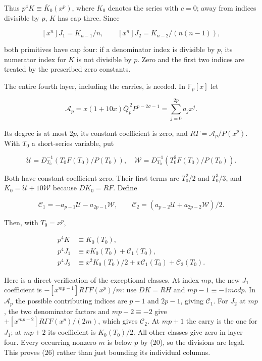\documentclass[11pt,a4paper]{article}
\begin{document}
Thus \(p^{4}K≡\overline{K}_{0}(x^p)\), where \(K_{0}\) denotes the series with \(c=0\); away from indices divisible by \(p\), \(K\) has cap three. Since

\[
[x^n]J_1=K_{n-1}/n,\qquad
[x^n]J_2=K_{n-2}/(n(n-1)),
\]

both primitives have cap four: if a denominator index is divisible by \(p\), its numerator index for \(K\) is not divisible by \(p\). Zero and the first two indices are treated by the prescribed zero constants.

The entire fourth layer, including the carries, is needed. In \(\mathbb{F}_p[x]\) let

\[
\mathcal A_p=x(1+10x)\overline Q_p^{\,2}P^{p-2\sigma-1}
=\sum_{j=0}^{2p}a_jx^j.
\]

Its degree is at most \(2p\), its constant coefficient is zero, and \(RΓ=\mathcal{A}_p/P(x^p)\). With \(T_{0}\) a short-series variable, put

\[
\mathcal U=D_{T_0}^{-1}(T_0F(T_0)/P(T_0)),\quad
\mathcal W=D_{T_0}^{-1}(T_0^2F(T_0)/P(T_0)).
\]

Both have constant coefficient zero. Their first terms are \(T_{0}^{2}/2\) and \(T_{0}^{3}/3\), and \(K_{0}=\mathcal{U}+10\mathcal{W}\) because \(DK_{0}=RF\). Define

\[
\mathcal C_1=-a_{p-1}\mathcal U-a_{2p-1}\mathcal W,
\qquad
\mathcal C_2=(a_{p-2}\mathcal U+a_{2p-2}\mathcal W)/2.
\]

Then, with \(T_{0}=x^p\),

\[
\begin{aligned}
p^4K&\equiv K_0(T_0),\\
p^4J_1&\equiv xK_0(T_0)+\mathcal C_1(T_0),\\
p^4J_2&\equiv x^2K_0(T_0)/2+x\mathcal C_1(T_0)+\mathcal C_2(T_0).
\end{aligned}
\tag{26}\]

Here is a direct verification of the exceptional classes. At index \(mp\), the new \(J_{1}\) coefficient is \(-[x^{mp-1}]RΓF(x^p)/m\): use \(DK=RH\) and \(mp-1≡-1 mod p\). In \(\mathcal{A}_p\) the possible contributing indices are \(p-1\) and \(2p-1\), giving \(\mathcal{C}_{1}\). For \(J_{2}\) at \(mp\), the two denominator factors and \(mp-2≡-2\) give \(+[x^{mp-2}]RΓF(x^p)/(2m)\), which gives \(\mathcal{C}_{2}\). At \(mp+1\) the carry is the one for \(J_{1}\); at \(mp+2\) its coefficient is \(K_{0}(T_{0})/2\). All other classes give zero in layer four. Every occurring nonzero \(m\) is below \(p\) by (20), so the divisions are legal. This proves (26) rather than just bounding its individual columns.
\end{document}
